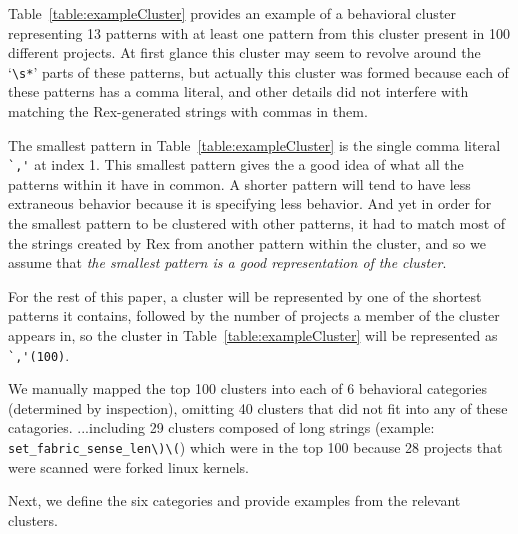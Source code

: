 Table~\ref{table:exampleCluster} provides an example of a behavioral cluster representing 13 patterns with at least one pattern from this cluster present in 100 different projects.  At first glance this cluster may seem to revolve around the `\verb!\s*!' parts of these patterns, but actually this cluster was formed because each of these patterns has a comma literal, and other details did not interfere with matching the Rex-generated strings with commas in them.


The smallest pattern in Table~\ref{table:exampleCluster} is the single comma literal \verb!`,'! at index 1.  This smallest pattern gives the a good idea of what all the patterns within it have in common.  A shorter pattern will tend to have less extraneous behavior because it is specifying less behavior.  And yet in order for the smallest pattern to be clustered with other patterns, it had to match most of the strings created by Rex from another pattern within the cluster, and so we assume that \emph{the smallest pattern is a good representation of the cluster}.

For the rest of this paper, a cluster will be represented by one of the shortest patterns it contains, followed by the number of projects a member of the cluster appears in, so the cluster in Table~\ref{table:exampleCluster} will be represented as \verb!`,'(100)!.

We  manually mapped the top 100 clusters into each of 6 behavioral categories (determined by inspection), omitting 40 clusters that did not fit into any of these catagories.
\leavevmode\color{gray}
 ...including 29 clusters composed of long strings (example: \verb!set_fabric_sense_len\)\(!) which were in the top 100 because 28 projects that were scanned were forked linux kernels.
\leavevmode\color{black}

Next, we define the six categories and provide examples from the relevant clusters.

